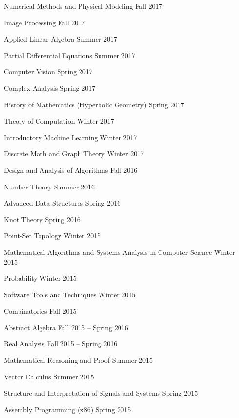 \documentclass[letterpaper,MMMyyyy,nonstopmode]{simpleresumecv}
\begin{document}
\begin{Body}
\BulletItem
Numerical Methods and Physical Modeling
\hfill Fall 2017

\BulletItem
Image Processing
\hfill Fall 2017

\BigGap
\BulletItem
Applied Linear Algebra
\hfill Summer 2017

\BulletItem
Partial Differential Equations
\hfill Summer 2017

\BulletItem
Computer Vision
\hfill Spring 2017

\BulletItem
Complex Analysis
\hfill Spring 2017

\BulletItem
History of Mathematics (Hyperbolic Geometry)
\hfill Spring 2017

\BulletItem
Theory of Computation
\hfill Winter 2017

\BulletItem
Introductory Machine Learning
\hfill Winter 2017

\BulletItem
Discrete Math and Graph Theory
\hfill Winter 2017

\BulletItem
Design and Analysis of Algorithms
\hfill Fall 2016

\BigGap

\BulletItem
Number Theory
\hfill Summer 2016

\BulletItem
Advanced Data Structures
\hfill Spring 2016

\BulletItem
Knot Theory
\hfill Spring 2016

\BulletItem
Point-Set Topology
\hfill Winter 2015

\BulletItem
Mathematical Algorithms and Systems Analysis in Computer Science
\hfill Winter 2015

\BulletItem
Probability
\hfill Winter 2015

\BulletItem
Software Tools and Techniques
\hfill Winter 2015

\BulletItem
Combinatorics
\hfill Fall 2015

\BulletItem
Abstract Algebra
\hfill Fall 2015 -- Spring 2016

\BulletItem
Real Analysis
\hfill Fall 2015 -- Spring 2016

\BigGap

\BulletItem
Mathematical Reasoning and Proof
\hfill Summer 2015

\BulletItem
Vector Calculus
\hfill Summer 2015

\BulletItem
Structure and Interpretation of Signals and Systems
\hfill Spring 2015

\BulletItem
Assembly Programming (x86)
\hfill Spring 2015


\end{Body}
\end{document}
